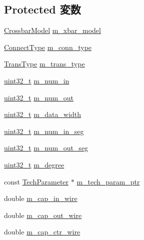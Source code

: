 \subsection*{Protected 変数}
\begin{DoxyCompactItemize}
\item 
\hyperlink{classCrossbar_aa40a1579cdca31019cb80ae5fd05b613}{CrossbarModel} \hyperlink{classCrossbar_ae408c5e80d21ee95cc1ea98cdf4491bf}{m\_\-xbar\_\-model}
\item 
\hyperlink{classCrossbar_a66513072647c657801d01bec3737a050}{ConnectType} \hyperlink{classCrossbar_a220177c04f3bc96e613546aa29ae86c7}{m\_\-conn\_\-type}
\item 
\hyperlink{classCrossbar_acee593b112f4fc85f850631b9c6aaae9}{TransType} \hyperlink{classCrossbar_ac53175ac9654b65ce59b57695eaa749c}{m\_\-trans\_\-type}
\item 
\hyperlink{Type_8hh_a435d1572bf3f880d55459d9805097f62}{uint32\_\-t} \hyperlink{classCrossbar_a1b7fd4d0b190b43023420e4ccf509632}{m\_\-num\_\-in}
\item 
\hyperlink{Type_8hh_a435d1572bf3f880d55459d9805097f62}{uint32\_\-t} \hyperlink{classCrossbar_ae171d0f87af81b1ea185cf41b5877bdc}{m\_\-num\_\-out}
\item 
\hyperlink{Type_8hh_a435d1572bf3f880d55459d9805097f62}{uint32\_\-t} \hyperlink{classCrossbar_ac5e1d7a9423578a0a670cdaf178b7931}{m\_\-data\_\-width}
\item 
\hyperlink{Type_8hh_a435d1572bf3f880d55459d9805097f62}{uint32\_\-t} \hyperlink{classCrossbar_a208d6aff22a25e908b139b8d84950212}{m\_\-num\_\-in\_\-seg}
\item 
\hyperlink{Type_8hh_a435d1572bf3f880d55459d9805097f62}{uint32\_\-t} \hyperlink{classCrossbar_ad3f4c106c1f38c6c0fa1030e00e2b925}{m\_\-num\_\-out\_\-seg}
\item 
\hyperlink{Type_8hh_a435d1572bf3f880d55459d9805097f62}{uint32\_\-t} \hyperlink{classCrossbar_aee48c0788b81abe67c001b66260af324}{m\_\-degree}
\item 
const \hyperlink{classTechParameter}{TechParameter} $\ast$ \hyperlink{classCrossbar_a11d1644aa2bfe0e16783dface6fadf13}{m\_\-tech\_\-param\_\-ptr}
\item 
double \hyperlink{classCrossbar_ab6e0e68486c6fec2f0635941a01d5b20}{m\_\-cap\_\-in\_\-wire}
\item 
double \hyperlink{classCrossbar_a784dbcadb2cc73b89ddc539c281810f0}{m\_\-cap\_\-out\_\-wire}
\item 
double \hyperlink{classCrossbar_aff75ea86eb8d501c2e71039c5a9c66a0}{m\_\-cap\_\-ctr\_\-wire}

\end{DoxyCompactItemize}
